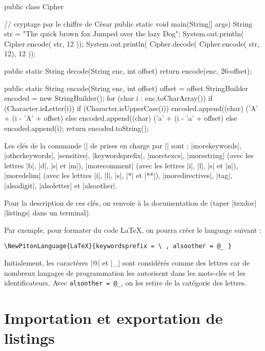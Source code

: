 \documentclass[dvipsnames,svgnames]{article}
\begin{document}
\bigskip
\begingroup
\small
{}
\begin{Piton}[language = Java]
public class Cipher { // cryptage par le chiffre de César
    public static void main(String[] args) {
        String str = "The quick brown fox Jumped over the lazy Dog";
        System.out.println( Cipher.encode( str, 12 ));
        System.out.println( Cipher.decode( Cipher.encode( str, 12), 12 ));
    }

    public static String decode(String enc, int offset) {
        return encode(enc, 26-offset);
    }

    public static String encode(String enc, int offset) {
        offset = offset %
        StringBuilder encoded = new StringBuilder();
        for (char i : enc.toCharArray()) {
            if (Character.isLetter(i)) {
                if (Character.isUpperCase(i)) {
                    encoded.append((char) ('A' + (i - 'A' + offset) %
                } else {
                    encoded.append((char) ('a' + (i - 'a' + offset) %
                }
            } else {
                encoded.append(i);
            }
        }
        return encoded.toString();
    }
}
\end{Piton}
\endgroup

\bigskip
Les clés de la commande |\lstdefinelanguage| de  prises en charge par
|\NewPitonLanguage| sont : |morekeywords|, |otherkeywords|, |sensitive|, |keywordsprefix|,
|moretexcs|, |morestring| (avec les lettres |b|, |d|, |s| et |m|), |morecomment| (avec les
lettres |i|, |l|, |s| et |n|), |moredelim| (avec les lettres |i|, |l|, |s|, |*| et |**|),
|moredirectives|, |tag|, |alsodigit|, |alsoletter| et |alsoother|.

Pour la description de ces clés, on renvoie à la documentation de  (taper
|texdoc| |listings| dans un terminal).

\bigskip
Par exemple, pour formater du code LaTeX, on pourra créer le language suivant : 
%
{\color{gray}
\begin{verbatim}
\NewPitonLanguage{LaTeX}{keywordsprefix = \ , alsoother = @_ }
\end{verbatim}
} 

Initialement, les caractères |@| et |_| sont considérés comme des lettres car de nombreux
langages de programmation les autorisent dans les mots-clés et les identificateurs. Avec
\verb|alsoother = @_|, on les retire de la catégorie des lettres.

\section{Importation et exportation de listings}
\end{document}
